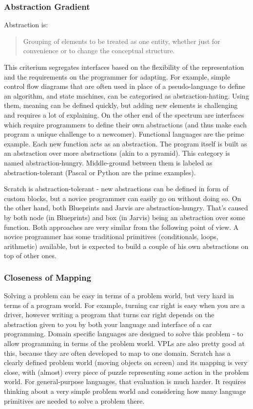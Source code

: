 \documentclass[11pt]{scrartcl}
\begin{document}
\subsubsection{Abstraction Gradient}
Abstraction is:
\blockquote[{\cite{Green96UsabilityAnalysis}}]{Grouping of elements to be
  treated as one entity, whether just for convenience or to change the
  conceptual structure.}
This criterium segregates interfaces based on the flexibility of the
representation and the requirements on the programmer for adapting.
For example, simple control flow diagrams that are often used in place of a
pseudo-language to define an algorithm, and state machines, can be categorised
as abstraction-hating.
Using them, meaning can be defined quickly, but adding new elements is
challenging and requires a lot of explaining.
On the other end of the spectrum are interfaces which require programmers to
define their own abstractions (and thus make each program a unique challenge to
a newcomer).
Functional languages are the prime example.
Each new function acts as an abstraction.
The program itself is built as an abstraction over more abstractions (akin to a
pyramid).
This category is named abstraction-hungry.
Middle-ground between them is labeled as abstraction-tolerant (Pascal or Python
are the prime examples).

Scratch is abstraction-tolerant - new abstractions can be defined in form of
custom blocks, but a novice programmer can easily go on without doing so.
On the other hand, both Blueprints and Jarvis are abstraction-hungry.
That’s caused by both node (in Blueprints) and box (in Jarvis) being an
abstraction over some function.
Both approaches are very similar from the following point of view.
A novice programmer has some traditional primitives (conditionals, loops,
arithmetic) available, but is expected to build a couple of his own abstractions
on top of other ones.

\subsubsection{Closeness of Mapping}
Solving a problem can be easy in terms of a problem world, but very hard in
terms of a program world.
For example, turning car right is easy when you are a driver, however writing a
program that turns car right depends on the abstraction given to you by both
your language and interface of a car programming.
Domain specific languages are designed to solve this problem - to allow
programming in terms of the problem world.
VPLs are also pretty good at this, because they are often developed to map to
one domain.
Scratch has a clearly defined problem world (moving objects on screen) and its
mapping is very close, with (almost) every piece of puzzle representing some
action in the problem world.
For general-purpose languages, that evaluation is much harder.
It requires thinking about a very simple problem world and considering how many
language primitives are needed to solve a problem there.
\end{document}
